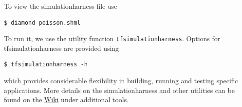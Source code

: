To view the simulationharness file use
\begin{lstlisting}[style=Bash]
 $ diamond poisson.shml
\end{lstlisting} %
To run it, we use the utility function
\texttt{tfsimulationharness}.  Options for tfsimulationharness are
provided using 
\begin{lstlisting}[style=Bash]
$ tfsimulationharness -h
\end{lstlisting} %
%
%
%
which provides considerable flexibility in building, running and
testing specific applications. More details on the simulationharness and
other \TF{} utilities can be found on the \TF{}
\href{https://terraferma.github.io}{Wiki} under additional tools.


